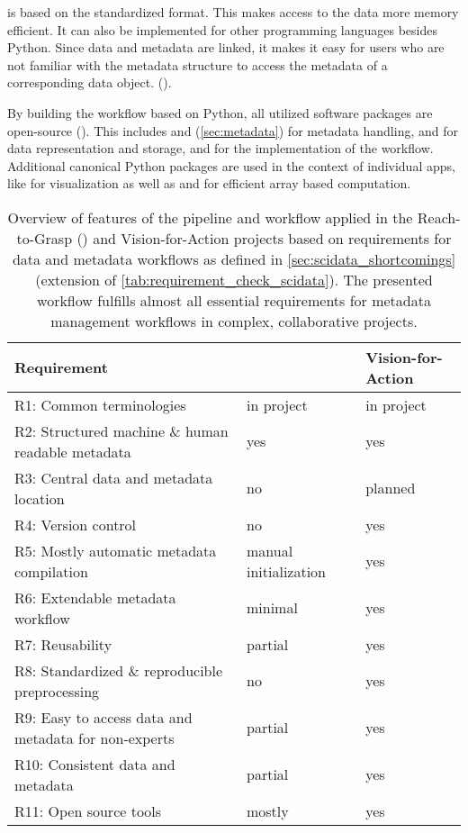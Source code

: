  is based on the standardized  format. This makes access to the data more memory efficient. It can also be implemented for other programming languages besides Python. Since data and metadata are linked, it makes it easy for users who are not familiar with the metadata structure to access the metadata of a corresponding data object. ().

By building the workflow based on Python, all utilized software packages are open-source (). This includes  and  (\cref{sec:metadata}) for metadata handling,  and  for data representation and storage, and  for the implementation of the workflow. Additional  canonical Python packages are used in the context of individual apps, like  for visualization as well as  and  for efficient array based computation.

\begin{table}[]
\footnotesize
\begin{tabular}{|l|l|l|}
\hline
Requirement                                          &  \cite{Brochier_2018} & Vision-for-Action \\  \hline
R1: Common terminologies                             &  in project & in project \\ \hline
R2: Structured machine \& human readable metadata    &  yes & yes \\ \hline
R3: Central data and metadata location               &  no & planned \\ \hline
R4: Version control                                  &  no & yes \\ \hline
R5: Mostly automatic metadata compilation            &  manual initialization & yes \\ \hline
R6: Extendable metadata workflow                     &  minimal & yes \\ \hline
R7: Reusability                                      &  partial & yes \\ \hline
R8: Standardized \& reproducible preprocessing       &  no & yes \\ \hline
R9: Easy to access data and metadata for non-experts &  partial & yes \\ \hline
R10: Consistent data and metadata                    &  partial & yes \\ \hline
R11: Open source tools                               &  mostly & yes \\ \hline
\end{tabular}
\caption[Overview of workflow features for Vision-for-Action project]{Overview of features of the pipeline and workflow applied in the Reach-to-Grasp (\cite{Brochier_2018}) and Vision-for-Action projects based on requirements for data and metadata workflows as defined in \cref{sec:scidata_shortcomings} (extension of \cref{tab:requirement_check_scidata}). The presented workflow fulfills almost all essential requirements for metadata management workflows in complex, collaborative projects.}
\label{tab:requirement_check_v4a}
\end{table}


